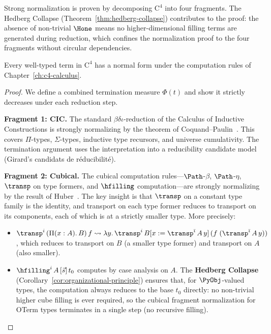 Strong normalization is proven by decomposing $\mathrm{C}^4$ into four
fragments.  The Hedberg Collapse (Theorem~\ref{thm:hedberg-collapse})
contributes to the proof: the absence of non-trivial $\Hone$ means no
higher-dimensional filling terms are generated during reduction, which
confines the normalization proof to the four fragments without circular
dependencies.

\begin{theorem}
\label{thm:strong-normalization}
Every well-typed term in $\mathrm{C}^4$ has a normal form under the
computation rules of Chapter~\ref{ch:c4-calculus}.
\end{theorem}

\begin{proof}
We define a combined termination measure $\Phi(t)$ and show it
strictly decreases under each reduction step.

\medskip
\noindent\textbf{Fragment 1: CIC.}
The standard $\beta\delta\iota$-reduction of the Calculus of Inductive
Constructions is strongly normalizing by the theorem of
Coquand--Paulin~\cite{paulin1993}.  This covers $\Pi$-types,
$\Sigma$-types, inductive type recursors, and universe cumulativity.
The termination argument uses the interpretation into a reducibility
candidate model (Girard's candidats de r\'educibilit\'e).

\medskip
\noindent\textbf{Fragment 2: Cubical.}
The cubical computation rules---$\Path$-$\beta$, $\Path$-$\eta$,
$\transp$ on type formers, and $\hfilling$ computation---are strongly
normalizing by the result of Huber~\cite{huber2018}.  The key insight is
that $\transp$ on a constant type family is the identity, and transport
on each type former reduces to transport on its components, each of which
is at a strictly smaller type.  More precisely:
\begin{itemize}
\item $\transp^i\, (\Pi(x:A).\,B)\, f \rightsquigarrow
  \lambda y.\, \transp^i\, B[x:=\transp^{\bar\imath}\,A\,y]\,
  (f\; (\transp^{\bar\imath}\,A\,y))$,
  which reduces to transport on $B$ (a smaller type former) and
  transport on $A$ (also smaller).
\item $\hfilling^i\, A\, [\vec{s}]\, t_0$ computes by case analysis
  on $A$.  The \textbf{Hedberg Collapse} (Corollary~\ref{cor:organizational-principle})
  ensures that, for $\PyObj$-valued types, the computation always
  reduces to the base $t_0$ directly: no non-trivial higher cube filling
  is ever required, so the cubical fragment normalization for OTerm types
  terminates in a single step (no recursive filling).
\end{itemize}


\end{proof}
